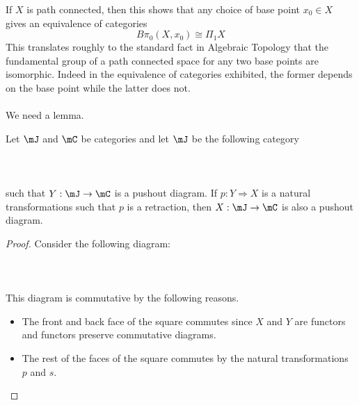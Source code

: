 \documentclass[a4paper]{article}
\begin{document}
If $X$ is path connected, then this shows that any choice of base point $x_0\in X$ gives an equivalence of categories $$B\pi_0(X,x_0)\cong\Pi_1X$$ This translates roughly to the standard fact in Algebraic Topology that the fundamental group of a path connected space for any two base points are isomorphic. Indeed in the equivalence of categories exhibited, the former depends on the base point while the latter does not. \\~\\

We need a lemma. 

\begin{lmm}{}{} Let $\mJ$ and $\mC$ be categories and let $\mJ$ be the following category \\~\\
 \\~\\
such that $Y:\mJ\to\mC$ is a pushout diagram. If $p:Y\Rightarrow X$ is a natural transformations such that $p$ is a retraction, then $X:\mJ\to\mC$ is also a pushout diagram. \tcbline
\begin{proof}
Consider the following diagram: \\~\\
 \\~\\
This diagram is commutative by the following reasons. 
\begin{itemize}
\item The front and back face of the square commutes since $X$ and $Y$ are functors and functors preserve commutative diagrams. 
\item The rest of the faces of the square commutes by the natural transformations $p$ and $s$. 
\end{itemize}


\end{proof}
\end{lmm}
\end{document}
